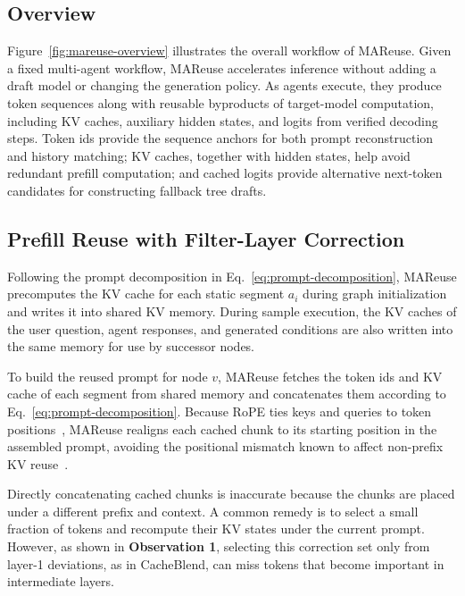 \documentclass[letterpaper]{article} %
\begin{document}
\subsection{Overview}

Figure~\ref{fig:mareuse-overview} illustrates the overall workflow of MAReuse. Given a fixed multi-agent workflow, MAReuse accelerates inference without adding a draft model or changing the generation policy. As agents execute, they produce token sequences along with reusable byproducts of target-model computation, including KV caches, auxiliary hidden states, and logits from verified decoding steps. Token ids provide the sequence anchors for both prompt reconstruction and history matching; KV caches, together with hidden states, help avoid redundant prefill computation; and cached logits provide alternative next-token candidates for constructing fallback tree drafts. 

\subsection{Prefill Reuse with Filter-Layer Correction}

Following the prompt decomposition in Eq.~\eqref{eq:prompt-decomposition}, MAReuse precomputes the KV cache for each static segment $a_i$ during graph initialization and writes it into shared KV memory. During sample execution, the KV caches of the user question, agent responses, and generated conditions are also written into the same memory for use by successor nodes.

To build the reused prompt for node $v$, MAReuse fetches the token ids and KV cache of each segment from shared memory and concatenates them according to Eq.~\eqref{eq:prompt-decomposition}. Because RoPE ties keys and queries to token positions~\citep{su2021roformer}, MAReuse realigns each cached chunk to its starting position in the assembled prompt, avoiding the positional mismatch known to affect non-prefix KV reuse~\citep{liu2026cacheslide}.

Directly concatenating cached chunks is inaccurate because the chunks are placed under a different prefix and context. A common remedy is to select a small fraction of tokens and recompute their KV states under the current prompt. However, as shown in \textbf{Observation 1}, selecting this correction set only from layer-1 deviations, as in CacheBlend, can miss tokens that become important in intermediate layers.
\end{document}
